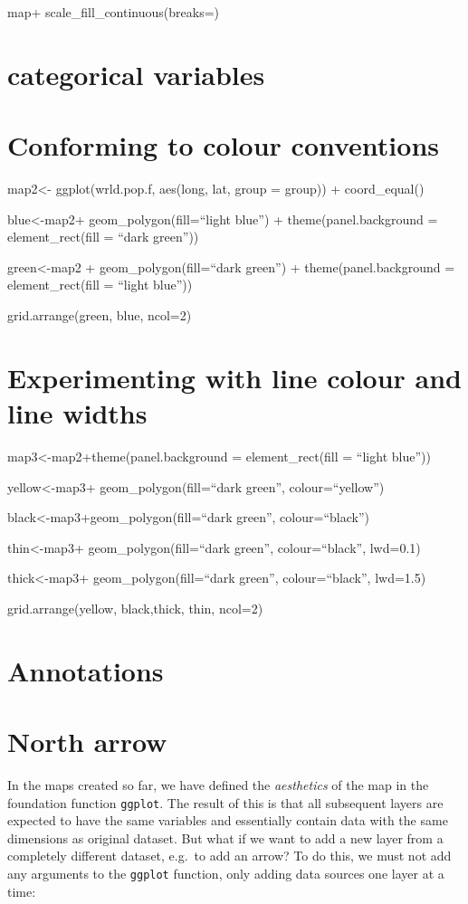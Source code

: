 \documentclass[]{article}
\begin{document}
map+ scale\_fill\_continuous(breaks=)

\section{categorical variables}

\section{Conforming to colour conventions}

map2\textless{}- ggplot(wrld.pop.f, aes(long, lat, group = group)) +
coord\_equal()

blue\textless{}-map2+ geom\_polygon(fill=``light blue'') +
theme(panel.background = element\_rect(fill = ``dark green''))

green\textless{}-map2 + geom\_polygon(fill=``dark green'') +
theme(panel.background = element\_rect(fill = ``light blue''))

grid.arrange(green, blue, ncol=2)

\section{Experimenting with line colour and line widths}

map3\textless{}-map2+theme(panel.background = element\_rect(fill =
``light blue''))

yellow\textless{}-map3+ geom\_polygon(fill=``dark green'',
colour=``yellow'')

black\textless{}-map3+geom\_polygon(fill=``dark green'',
colour=``black'')

thin\textless{}-map3+ geom\_polygon(fill=``dark green'',
colour=``black'', lwd=0.1)

thick\textless{}-map3+ geom\_polygon(fill=``dark green'',
colour=``black'', lwd=1.5)

grid.arrange(yellow, black,thick, thin, ncol=2)

\section{Annotations}

\section{North arrow}

In the maps created so far, we have defined the \emph{aesthetics} of the
map in the foundation function \texttt{ggplot}. The result of this is
that all subsequent layers are expected to have the same variables and
essentially contain data with the same dimensions as original dataset.
But what if we want to add a new layer from a completely different
dataset, e.g.~to add an arrow? To do this, we must not add any arguments
to the \texttt{ggplot} function, only adding data sources one layer at a
time:
\end{document}
